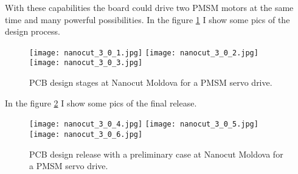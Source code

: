    With these capabilities the board could drive two PMSM motors at the same time and many
   powerful possibilities.  In the figure \ref{fig:nanocut_3_0_1} I show some pics of the design
   process.
  \begin{figure}
      \begin{center}
         \texttt{[image: nanocut\_3\_0\_1.jpg]}
         \texttt{[image: nanocut\_3\_0\_2.jpg]}
         \texttt{[image: nanocut\_3\_0\_3.jpg]}
      \end{center}
      \caption{PCB design stages at Nanocut Moldova for a PMSM servo drive.}
      \label{fig:nanocut_3_0_1}
   \end{figure}
In the figure \ref{fig:nanocut_3_0_2} I show some pics of the final release.
  \begin{figure}
      \begin{center}
         \texttt{[image: nanocut\_3\_0\_4.jpg]}
         \texttt{[image: nanocut\_3\_0\_5.jpg]}
         \texttt{[image: nanocut\_3\_0\_6.jpg]}
      \end{center}
      \caption{PCB design release with a preliminary case at Nanocut Moldova for a PMSM servo drive.}
      \label{fig:nanocut_3_0_2}
   \end{figure}
